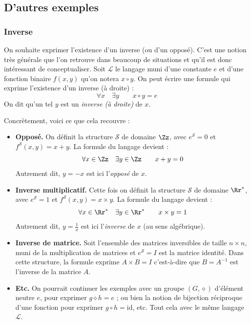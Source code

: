 \documentclass[11pt,class=report,crop=false]{standalone}
\begin{document}
\subsection{D'autres exemples}

\subsubsection{Inverse}

On souhaite exprimer l'existence d'un inverse (ou d'un opposé). C'est une notion très générale que l'on retrouve dans beaucoup de situations et qu'il est donc intéressant de conceptualiser.
Soit $\mathcal{L}$ le langage muni d'une constante $e$ et d'une fonction binaire $f(x,y)$ qu'on notera $x \circ y$.
On peut écrire une formule qui exprime l'existence d'un inverse (à droite) :
\[
\forall x \quad \exists y \qquad x \circ y = e
\]
On dit qu'un tel $y$ est un \emph{inverse (à droite)} de $x$.

Concrètement, voici ce que cela recouvre :
\begin{itemize}
	\item \textbf{Opposé.} On définit la structure $\mathcal{S}$ de domaine $\Zz$, avec 
	$e^{\mathcal{S}} = 0$ et $f^{\mathcal{S}}(x,y) = x + y$. La formule du langage devient :
	\[
	\forall x \in \Zz \quad \exists y \in \Zz  \qquad x + y = 0
	\]
	Autrement dit, $y=-x$ est ici l'\emph{opposé} de $x$.
	
	
	\item \textbf{Inverse multiplicatif.} Cette fois on définit la structure $\mathcal{S}$ de domaine $\Rr^*$, avec 
	$e^{\mathcal{S}} = 1$ et $f^{\mathcal{S}}(x,y) = x \times y$. La formule du langage devient :
	\[
	\forall x \in \Rr^* \quad \exists y \in \Rr^*  \qquad x \times y = 1
	\]
	Autrement dit, $y= \frac{1}{x}$ est ici l'\emph{inverse} de $x$ (au sens algébrique).
	
	\item \textbf{Inverse de matrice.} Soit l'ensemble des matrices inversibles de taille $n \times n$, muni de la multiplication de matrices et $e^{\mathcal{S}} = I$ est la matrice identité. Dans cette structure, la formule exprime $A \times B = I$ c'est-à-dire que $B = A^{-1}$ est l'inverse de la matrice $A$.
	
	\item \textbf{Etc.} On pourrait continuer les exemples avec un groupe $(G, \diamond)$ d'élément neutre $e$, pour exprimer $g \diamond h = e$ ; ou bien la notion de bijection réciproque d'une fonction pour exprimer $g \circ h = \text{id}$, etc. Tout cela avec le même langage $\mathcal{L}$.
\end{itemize}
\end{document}
